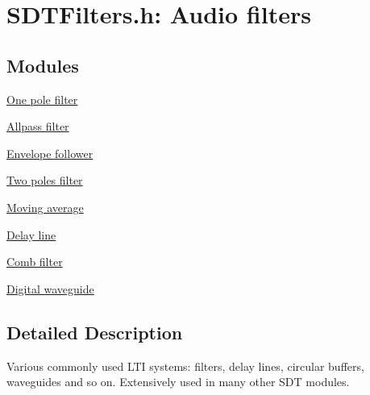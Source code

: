 \hypertarget{group__filters}{}\section{S\+D\+T\+Filters.\+h\+: Audio filters}
\label{group__filters}
\subsection*{Modules}
\begin{DoxyCompactItemize}
\item 
\hyperlink{group__onepole}{One pole filter}
\item 
\hyperlink{group__allpass}{Allpass filter}
\item 
\hyperlink{group__envelope}{Envelope follower}
\item 
\hyperlink{group__twopoles}{Two poles filter}
\item 
\hyperlink{group__average}{Moving average}
\item 
\hyperlink{group__delay}{Delay line}
\item 
\hyperlink{group__comb}{Comb filter}
\item 
\hyperlink{group__waveguide}{Digital waveguide}
\end{DoxyCompactItemize}


\subsection{Detailed Description}
Various commonly used L\+T\+I systems\+: filters, delay lines, circular buffers, waveguides and so on. Extensively used in many other S\+D\+T modules. 